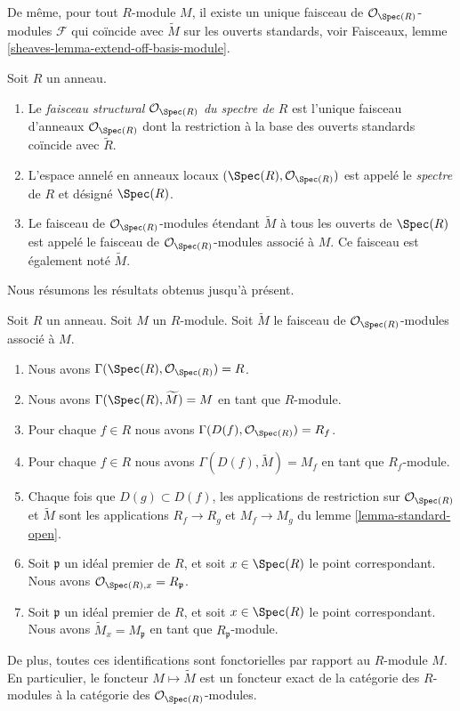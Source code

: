 \medskip\noindent
De même, pour tout $R$-module $M$, il existe un
unique faisceau de $\mathcal{O}_{\Spec(R)}$-modules
$\mathcal{F}$ qui coïncide avec $\widetilde M$ sur les
ouverts standards, voir
Faisceaux, lemme \ref{sheaves-lemma-extend-off-basis-module}.

\begin{definition}
\label{definition-structure-sheaf}
Soit $R$ un anneau.
\begin{enumerate}
\item Le {\it faisceau structural $\mathcal{O}_{\Spec(R)}$ du spectre
de $R$} est l'unique faisceau d'anneaux $\mathcal{O}_{\Spec(R)}$ dont la
restriction à la base des ouverts standards coïncide avec $\widetilde
R$. \item L'espace annelé en
anneaux locaux $(\Spec(R), \mathcal{O}_{\Spec(R)})$
est appelé le {\it spectre} de $R$ et désigné $\Spec(R)$.
\item Le faisceau de $\mathcal{O}_{\Spec(R)}$-modules
étendant $\widetilde M$ à tous les ouverts de
$\Spec(R)$ est appelé le faisceau de $\mathcal{O}_{\Spec(R)}$-modules
associé à $M$. Ce faisceau est également noté $\widetilde
M$.
\end{enumerate}
\end{definition}

\noindent
Nous résumons les résultats obtenus jusqu'à présent.

\begin{lemma}
\label{lemma-spec-sheaves}
Soit $R$ un anneau. Soit $M$ un $R$-module. Soit $\widetilde M$
le faisceau de $\mathcal{O}_{\Spec(R)}$-modules
associé à $M$.
\begin{enumerate}
\item Nous avons $\Gamma(\Spec(R), \mathcal{O}_{\Spec(R)}) = R$. \item
Nous avons $\Gamma(\Spec(R), \widetilde M) = M$ en tant que $R$-module.
\item Pour chaque $f \in R$ nous avons
$\Gamma(D(f), \mathcal{O}_{\Spec(R)}) = R_f$.
\item Pour chaque $f\in R$ nous avons $\Gamma(D(f), \widetilde M) = M_f$ en
tant que $R_f$-module.
\item Chaque fois que $D(g) \subset D(f)$, les applications de
restriction sur $\mathcal{O}_{\Spec(R)}$ et $\widetilde
M$ sont
les applications $R_f \to R_g$ et $M_f \to M_g$
du lemme \ref{lemma-standard-open}.
\item Soit $\mathfrak p$ un idéal premier de $R$, et soit $x \in
\Spec(R)$ le point correspondant. Nous
avons $\mathcal{O}_{\Spec(R), x} = R_{\mathfrak
p}$. \item Soit $\mathfrak p$ un idéal premier de $R$, et soit $x \in \Spec(R)$
le point correspondant. Nous avons $\widetilde M_x = M_{\mathfrak p}$ en
tant que $R_{\mathfrak p}$-module.
\end{enumerate}
De plus, toutes ces identifications sont fonctorielles par rapport
au $R$-module $M$. En particulier, le foncteur $M \mapsto \widetilde
M$ est un foncteur exact de la catégorie des $R$-modules
à la catégorie des $\mathcal{O}_{\Spec(R)}$-modules.
\end{lemma}

